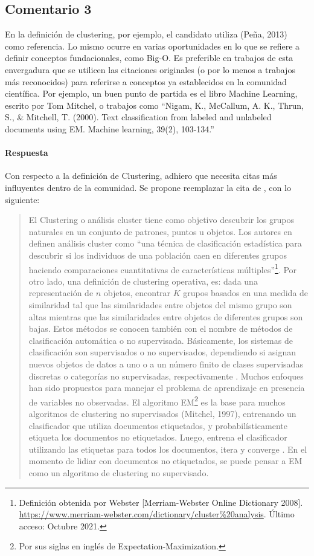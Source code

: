 \subsection*{Comentario 3}
En la definición de clustering, por ejemplo, el candidato utiliza (Peña, 2013) como referencia. Lo mismo ocurre en varias oportunidades en lo que se refiere a definir conceptos fundacionales, como Big-O. Es preferible en trabajos de esta envergadura que se utilicen las citaciones originales (o por lo menos a trabajos más reconocidos) para referirse a conceptos ya establecidos en la comunidad científica. Por ejemplo, un buen punto de partida es el libro Machine Learning, escrito por Tom Mitchel, o trabajos como ``Nigam, K., McCallum, A. K., Thrun, S., \& Mitchell, T. (2000). Text classification from labeled and unlabeled documents using EM. Machine learning, 39(2), 103-134.''

\paragraph*{Respuesta}
Con respecto a la definición de Clustering, adhiero que necesita citas más influyentes dentro de la comunidad. Se propone reemplazar la cita de \citep{pena2013analisis}, con lo siguiente:

\begin{quotation}
	El Clustering o análisis cluster tiene como objetivo descubrir los grupos naturales en un conjunto de patrones, puntos u objetos. Los autores en \citep{jain2010data} definen análisis cluster como ``una técnica de clasificación estadística para descubrir si los individuos de una población caen en diferentes grupos haciendo comparaciones cuantitativas de características múltiples''\footnote{Definición obtenida por Webster [Merriam-Webster Online Dictionary 2008]. \url{https://www.merriam-webster.com/dictionary/cluster\%20analysis}. Último acceso: Octubre 2021.}. Por otro lado, una definición de clustering operativa, es: dada una representación de \(n\) objetos, encontrar \(K\) grupos basados en una medida de similaridad tal que las similaridades entre objetos del mismo grupo son altas mientras que las similaridades entre objetos de diferentes grupos son bajas. Estos métodos se conocen también con el nombre de métodos de clasificación automática o no supervisada. Básicamente, los sistemas de clasificación son supervisados o no supervisados, dependiendo si asignan nuevos objetos de datos a uno o a un número finito de clases supervisadas discretas o categorías no supervisadas, respectivamente \citep{xu2008clustering}. Muchos enfoques han sido propuestos para manejar el problema de aprendizaje en presencia de variables no observadas. El algoritmo EM\footnote{Por sus siglas en inglés de Expectation-Maximization.} es la base para muchos algoritmos de clustering no supervisados (Mitchel, 1997), entrenando un clasificador que utiliza documentos etiquetados, y probabilísticamente etiqueta los documentos no etiquetados. Luego, entrena el clasificador utilizando las etiquetas para todos los documentos, itera y converge \citep{nigam2000text}. En el momento de lidiar con documentos no etiquetados, se puede pensar a EM como un algoritmo de clustering no supervisado.
\end{quotation}

